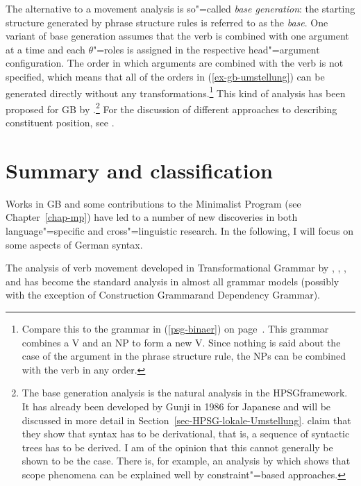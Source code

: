 The alternative to a movement analysis is so"=called \emph{base generation}: the starting structure generated by phrase structure
rules is referred to as the \emph{base}. One variant of base generation assumes that the verb is
combined with one argument at a time and each $\theta$"=roles is assigned in the respective head"=argument configuration. The order in which
arguments are combined with the verb is not specified, which means that all of the orders in (\ref{ex-gb-umstellung}) can be
generated directly without any transformations.\footnote{
 Compare this to the grammar in (\ref{psg-binaer}) on page~\pageref{psg-binaer}. This grammar
 combines a V and an NP to form a new V. Since nothing is said about the case of the argument in the
 phrase structure rule, the NPs can be combined with the verb in any order.
} This kind of analysis has
been proposed for GB by \citet{Fanselow2001a}.\footnote{%
	The base generation analysis is the natural analysis in the HPSG\indexhpsg framework. It has already been developed by Gunji\nocite{Gunji86a}
	in 1986 for Japanese and will be discussed in more detail in Section~\ref{sec-HPSG-lokale-Umstellung}. \citet[--314]{SE2002a}
	claim that they show that syntax has to be derivational, that is, a sequence of syntactic
        trees has to be derived. I am of the opinion that this cannot generally be shown to be the
        case. There is, for example, an analysis by \citet{Kiss2001a} which shows that scope
        phenomena can be explained well by constraint"=based approaches.
}
For the discussion of different approaches to describing constituent position, see 
.




\section{Summary and classification}
\label{sec-summary-gb}

Works in GB and some contributions to the Minimalist Program (see Chapter~\ref{chap-mp}) have led to a number of new discoveries in both language"=specific and cross"=linguistic research. In
the following, I will focus on some aspects of German syntax.

The analysis of verb movement developed in Transformational Grammar by \citet*[]{Bierwisch63}, \citet{Reis74a},
\citet{Koster75a}, \citet[Chapter~1]{Thiersch78a} and \citet{denBesten83a} has become the standard analysis in almost
all grammar models (possibly with the exception of Construction Grammar\indexcxg and Dependency Grammar\indexdg).

